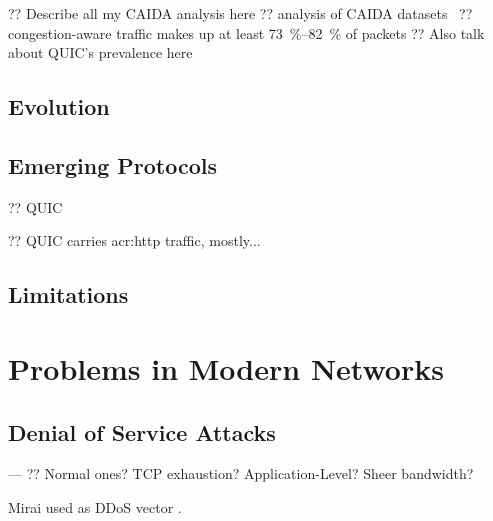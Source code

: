 ?? Describe all my CAIDA analysis here
?? analysis of CAIDA datasets~\parencite{caida-2018-passive}
?? congestion-aware traffic makes up at least \qtyrange{73}{82}{\percent} of packets
?? Also talk about QUIC's prevalence here

\subsection{Evolution}

\subsection{Emerging Protocols}

?? QUIC~\parencite{DBLP:conf/sigcomm/LangleyRWVKZYKS17}

?? QUIC carries \gls{acr:http} traffic, mostly...

\subsection{Limitations}

\section{Problems in Modern Networks}\label{sec:problems-in-modern-networks}

\subsection{Denial of Service Attacks}
---
?? Normal ones? TCP exhaustion? Application-Level? Sheer bandwidth?

Mirai used as DDoS vector \cite{DBLP:conf/uss/AntonakakisABBB17}.

